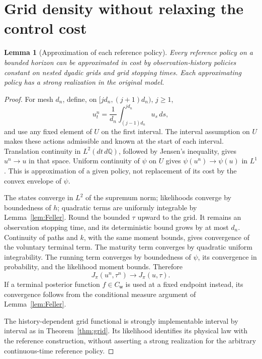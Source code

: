 \documentclass[11pt,a4paper]{article}
\newtheorem{lemma}[theorem]{Lemma}
\theoremstyle{definition}
\theoremstyle{remark}
\newcommand{\Qq}{\mathbb Q}
\newcommand{\CW}{C_{\mathsf w}}
\begin{document}
\section{Grid density without relaxing the control cost}

\begin{lemma}[Approximation of each reference policy]\label{lem:density}
Every reference policy on a bounded horizon can be approximated in
cost by observation-history policies constant on nested dyadic grids
and grid stopping times. Each approximating policy has a strong
realization in the original model.
\end{lemma}
\begin{proof}
For mesh \(d_n\), define, on \([jd_n,(j+1)d_n)\), \(j\geq1\),
\[
 u_t^n=\frac1{d_n}\int_{(j-1)d_n}^{jd_n}u_s\,ds,
\]
and use any fixed element of \(U\) on the first interval. The
interval assumption on \(U\) makes these actions admissible and
known at the start of each interval. Translation continuity in
\(L^2(dt\,d\Qq)\), followed by Jensen's inequality, gives
\(u^n\to u\) in that space. Uniform continuity of \(\psi\) on \(U\)
gives \(\psi(u^n)\to\psi(u)\) in \(L^1\).
This is approximation of a given policy, not replacement of its
cost by the convex envelope of \(\psi\).

The states converge in \(L^2\) of the supremum norm; likelihoods
converge by boundedness of \(h\); quadratic terms are uniformly
integrable by Lemma~\ref{lem:Feller}. Round the bounded \(\tau\)
upward to the grid. It remains an observation stopping time,
and its deterministic bound grows by at most \(d_n\).
Continuity of paths and \(k\), with the same moment bounds,
gives convergence of the voluntary terminal term. The maturity
term converges by quadratic uniform integrability. The running
term converges by boundedness of \(\psi\), its convergence in
probability, and the likelihood moment bounds. Therefore
\[
 J_\pi(u^n,\tau^n)\longrightarrow J_\pi(u,\tau).
\]
If a terminal posterior function \(f\in\CW\) is used at a fixed
endpoint instead, its convergence follows from the conditional
measure argument of Lemma~\ref{lem:Feller}.

The history-dependent grid functional is strongly implementable
interval by interval as in Theorem~\ref{thm:grid}.
Its likelihood identifies its physical law with the reference
construction, without asserting a strong realization for the
arbitrary continuous-time reference policy.
\end{proof}
\end{document}
